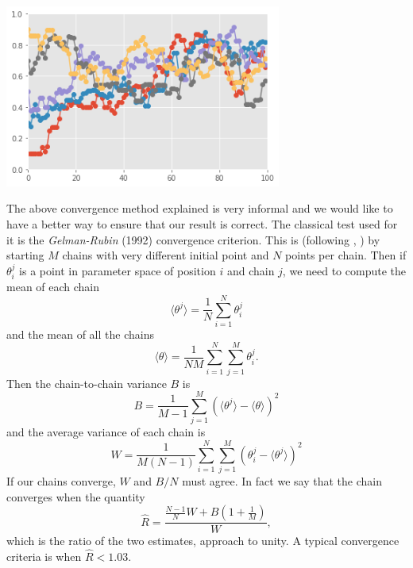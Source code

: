 \documentclass[onecolumn,           %
               showpacs,            %
               preprintnumbers,     %
               aps,                 %
               prl,          	    %
               letterpaper,             %
               superscriptaddress,      %
               nofootinbib,         %
               tightenlines,        %
               floats,floatfix      %
               ,usenatbib,
               ]{revtex4-1}
\begin{document}
\begin{minipage}{\textwidth}
\centering
\includegraphics[height=6cm]{chain22.png}
\label{chain2}
\end{minipage}


The above convergence method explained is very informal and we would like to have a better way to ensure that our result is correct. The classical test used for it is the \textit{Gelman-Rubin} (1992) convergence criterion. This is (following \cite{LicV2}, \cite{AlanH}) by starting $M$ chains with very different initial point and $N$ points per chain. Then if $\theta_i^j$ is a point in parameter space of position $i$ and chain $j$, we need to compute the mean of each chain 
\begin{equation}
\langle\theta^j\rangle =\frac{1}{N}\sum_{i=1}^N \theta_i^j
\end{equation}
and the mean of all the chains
\begin{equation}
\langle\theta\rangle =\frac{1}{NM}\sum_{i=1}^N\sum_{j=1}^M\theta_i^j.
\end{equation}
Then the chain-to-chain variance $B$ is
\begin{equation}
B=\frac{1}{M-1}\sum_{j=1}^M(\langle\theta^j\rangle-\langle\theta\rangle)^2
\end{equation}
and the average variance of each chain is
\begin{equation}
W=\frac{1}{M(N-1)}\sum_{i=1}^N\sum_{j=1}^M(\theta_i^j-\langle\theta^j\rangle)^2
\end{equation}
If our chains converge, $W$ and $B/N$ must agree. In fact we say that the chain converges when the quantity
\begin{equation}
\hat R=\frac{\frac{N-1}{N}W+B(1+\frac{1}{M})}{W},
\end{equation}
which is the ratio of the two estimates, approach to unity. A typical convergence criteria is when $\hat R<1.03$. 
\end{document}
